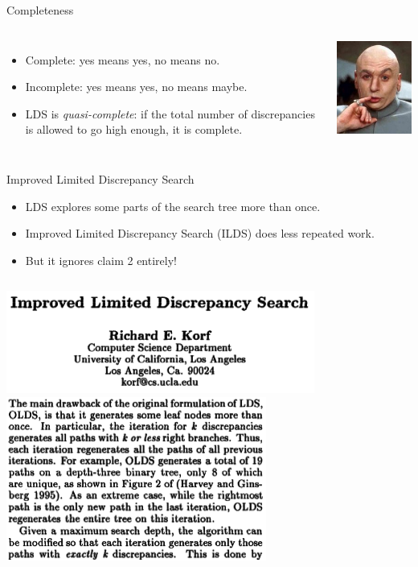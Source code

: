 \documentclass{beamer}
\begin{document}
\begin{frame}{Completeness}
    \begin{columns}
        \begin{itemize}
            \item Complete: yes means yes, no means no.
            \item Incomplete: yes means yes, no means maybe.
            \item LDS is \emph{quasi-complete}: if the total number of discrepancies is allowed to go
                high enough, it is complete.
        \end{itemize}
        \centering\includegraphics*[keepaspectratio=true,scale=0.4]{quasi.jpg}
    \end{columns}
\end{frame}

\begin{frame}{Improved Limited Discrepancy Search}
    \begin{itemize}
        \item LDS explores some parts of the search tree more than once.
        \item Improved Limited Discrepancy Search (ILDS) does less repeated work.
        \item But it ignores claim 2 entirely!
    \end{itemize}

    \begin{columns}[T]
        \centering\includegraphics*[keepaspectratio=true,scale=0.4]{ilds-paper.png}
        \centering\includegraphics*[keepaspectratio=true,scale=0.4]{ilds-claim.png}
    \end{columns}
\end{frame}
\end{document}
